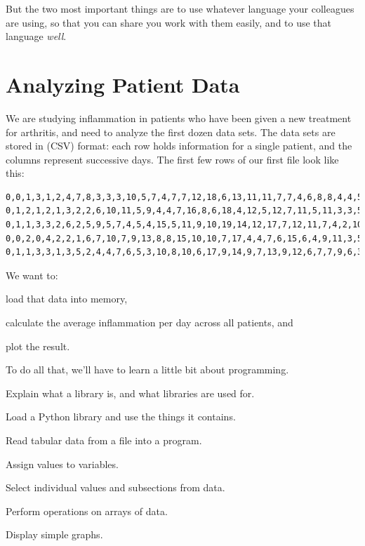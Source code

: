 \documentclass{book}
\begin{document}
But the two most important things are to use whatever language your
colleagues are using, so that you can share you work with them easily,
and to use that language \emph{well}.

\section{Analyzing Patient Data}

We are studying inflammation in patients who have been given a new
treatment for arthritis, and need to analyze the first dozen data sets.
The data sets are stored in 
(CSV) format: each row holds information for a single patient, and the
columns represent successive days. The first few rows of our first file
look like this:

\begin{verbatim}
0,0,1,3,1,2,4,7,8,3,3,3,10,5,7,4,7,7,12,18,6,13,11,11,7,7,4,6,8,8,4,4,5,7,3,4,2,3,0,0
0,1,2,1,2,1,3,2,2,6,10,11,5,9,4,4,7,16,8,6,18,4,12,5,12,7,11,5,11,3,3,5,4,4,5,5,1,1,0,1
0,1,1,3,3,2,6,2,5,9,5,7,4,5,4,15,5,11,9,10,19,14,12,17,7,12,11,7,4,2,10,5,4,2,2,3,2,2,1,1
0,0,2,0,4,2,2,1,6,7,10,7,9,13,8,8,15,10,10,7,17,4,4,7,6,15,6,4,9,11,3,5,6,3,3,4,2,3,2,1
0,1,1,3,3,1,3,5,2,4,4,7,6,5,3,10,8,10,6,17,9,14,9,7,13,9,12,6,7,7,9,6,3,2,2,4,2,0,1,1
\end{verbatim}

We want to:

\begin{swcitemize}
\item
  load that data into memory,
\item
  calculate the average inflammation per day across all patients, and
\item
  plot the result.
\end{swcitemize}

To do all that, we'll have to learn a little bit about programming.

\begin{objectives}
\begin{swcitemize}
\item
  Explain what a library is, and what libraries are used for.
\item
  Load a Python library and use the things it contains.
\item
  Read tabular data from a file into a program.
\item
  Assign values to variables.
\item
  Select individual values and subsections from data.
\item
  Perform operations on arrays of data.
\item
  Display simple graphs.
\end{swcitemize}
\end{objectives}
\end{document}
